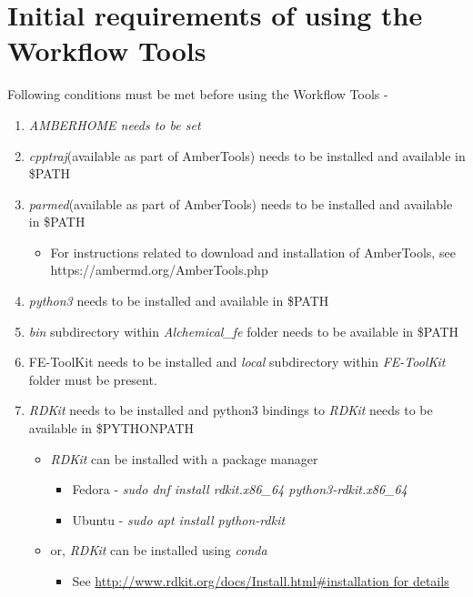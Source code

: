 \documentclass[11pt,letterpaper,titlepage]{article}
\begin{document}
\vspace{0.1cm}
\section{Initial requirements of using the Workflow Tools}
\vspace{0.1cm}

Following conditions must be met before using the Workflow Tools -
\renewcommand{\labelenumi}{\Roman{enumi}}
\begin{enumerate}
	\item {\textit{AMBERHOME needs to be set}}
	\item{\textit{cpptraj}(available as part of AmberTools) needs to be installed and available in \$PATH}
	\item{\textit{parmed}(available as part of AmberTools) needs to be installed and available in \$PATH}
		\begin{itemize}
			\item For instructions related to download and installation of AmberTools, see \\
				https://ambermd.org/AmberTools.php
		\end{itemize}
	\item{\textit{python3} needs to be installed and available in \$PATH}
	\item{\textit{bin} subdirectory within \textit{Alchemical\_fe} folder needs to be available in \$PATH}
	\item{FE-ToolKit needs to be installed and \textit{local} subdirectory within \textit{FE-ToolKit} folder must be present.}
	\item{\textit{RDKit} needs to be installed and python3 bindings to \textit{RDKit} needs to be available in \$PYTHONPATH}
	\begin{itemize}
		\item{\textit{RDKit} can be installed with a package manager}
		\begin{itemize}
			\item{Fedora - \textit{sudo dnf install rdkit.x86\_64 python3-rdkit.x86\_64}}
			\item{Ubuntu - \textit{sudo apt install python-rdkit}}
		\end{itemize}
		\item{or, \textit{RDKit} can be installed using \textit{conda}}
		\begin{itemize}
			\item{See \url{http://www.rdkit.org/docs/Install.html\#installation for details}}
		\end{itemize}

\end{itemize}
\end{enumerate}
\end{document}
